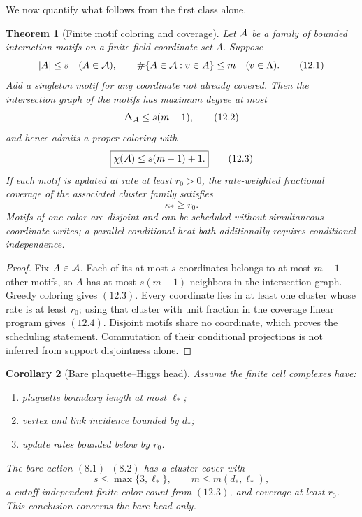 \documentclass[11pt]{article}
\newtheorem{theorem}{Theorem}[section]
\newtheorem{corollary}[theorem]{Corollary}
\theoremstyle{remark}
\begin{document}
We now quantify what follows from the first class alone.

\begin{theorem}[Finite motif coloring and coverage]
\label{thm:v15v12-coloring}
Let \({\cal A}\) be a family of bounded interaction motifs on a
finite field-coordinate set \(\Lambda\).  Suppose
\[
 |A|\le s\quad(A\in{\cal A}),\qquad
 \#\{A\in{\cal A}:v\in A\}\le m\quad(v\in\Lambda).            \tag{12.1}
\]
Add a singleton motif for any coordinate not already covered.
Then the intersection graph of the motifs has maximum degree at
most
\[
 \Delta_{\cal A}\le s(m-1),                                  \tag{12.2}
\]
and hence admits a proper coloring with
\[
 \boxed{\chi({\cal A})\le s(m-1)+1.}                         \tag{12.3}
\]
If each motif is updated at rate at least \(r_0>0\), the
rate-weighted fractional coverage of the associated cluster family
satisfies
\[
 \boxed{\kappa_*\ge r_0.}                                    \tag{12.4}
\]
Motifs of one color are disjoint and can be scheduled without
simultaneous coordinate writes; a parallel conditional heat bath
additionally requires conditional independence.
\end{theorem}

\begin{proof}
Fix \(A\in{\cal A}\).  Each of its at most \(s\) coordinates
belongs to at most \(m-1\) other motifs, so \(A\) has at most
\(s(m-1)\) neighbors in the intersection graph.  Greedy coloring
gives \((12.3)\).  Every coordinate lies in at least one cluster
whose rate is at least \(r_0\); using that cluster with unit
fraction in the coverage linear program gives \((12.4)\).
Disjoint motifs share no coordinate, which proves the scheduling statement.  Commutation of their conditional projections is not inferred from support disjointness alone.
\end{proof}

\begin{corollary}[Bare plaquette--Higgs head]
\label{cor:v15v12-bare-cover}
Assume the finite cell complexes have:
\begin{enumerate}
\item plaquette boundary length at most \(\ell_*\);
\item vertex and link incidence bounded by \(d_*\);
\item update rates bounded below by \(r_0\).
\end{enumerate}
The bare action \((8.1)\)--\((8.2)\) has a cluster cover with
\[
 s\le\max\{3,\ell_*\},\qquad m\le m(d_*,\ell_*),              \tag{12.5}
\]
a cutoff-independent finite color count from \((12.3)\), and
coverage at least \(r_0\).  This conclusion concerns the bare
head only.
\end{corollary}
\end{document}
